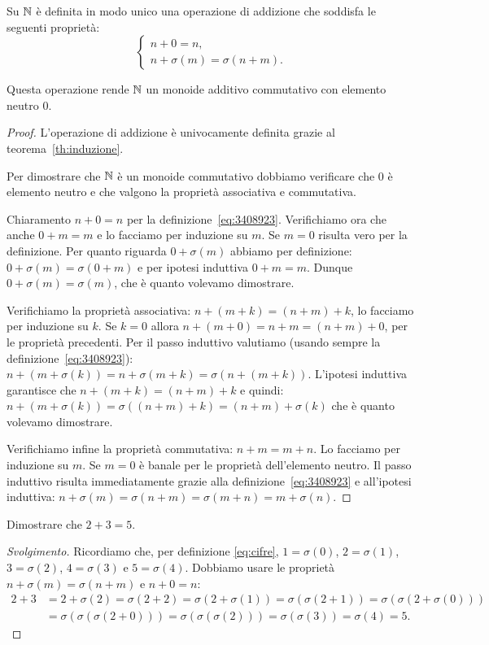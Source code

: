 \begin{theorem}[addizione su $\NN$]
  \label{th:addizione_naturali}%
Su $\NN$ è definita in modo unico una operazione di addizione 
che soddisfa le seguenti proprietà:
\begin{equation}\label{eq:3408923}
  \begin{cases}
    n + 0 = n,\\
    n + \sigma(m) = \sigma(n+m).
  \end{cases}
\end{equation}

Questa operazione rende $\NN$ un monoide additivo commutativo 
con elemento neutro $0$.
\end{theorem}
\begin{proof}
L'operazione di addizione è univocamente definita 
grazie al teorema~\ref{th:induzione}.

Per dimostrare che $\NN$ è un monoide commutativo dobbiamo verificare
che $0$ è elemento neutro e che valgono la proprietà associativa 
e commutativa.

Chiaramento $n+0=n$ per la definizione~\eqref{eq:3408923}. 
Verifichiamo ora che anche $0+m=m$ e lo facciamo per induzione su $m$.
Se $m=0$ risulta vero per la definizione.
Per quanto riguarda $0+\sigma(m)$ abbiamo per definizione:
$0+\sigma(m)=\sigma(0+m)$ e per ipotesi induttiva $0+m=m$.
Dunque $0+\sigma(m)=\sigma(m)$, che è quanto volevamo dimostrare.

Verifichiamo la proprietà associativa: $n+(m+k) = (n+m)+k$, lo 
facciamo per induzione su $k$. 
Se $k=0$ allora $n+(m+0)=n+m=(n+m)+0$, per le proprietà precedenti.
Per il passo induttivo valutiamo (usando sempre la definizione~\eqref{eq:3408923}):
$n+(m+\sigma(k)) = n+\sigma(m+k) =\sigma(n+(m+k))$.
L'ipotesi induttiva garantisce che $n+(m+k)=(n+m)+k$ e quindi:
$n+(m+\sigma(k)) = \sigma((n+m)+k) = (n+m)+\sigma(k)$
che è quanto volevamo dimostrare.

Verifichiamo infine la proprietà commutativa: $n+m=m+n$.
Lo facciamo per induzione su $m$. 
Se $m=0$ è banale per le proprietà dell'elemento neutro.
Il passo induttivo risulta immediatamente 
grazie alla definizione~\ref{eq:3408923} 
e all'ipotesi induttiva: 
$n+\sigma(m) = \sigma(n+m) = \sigma(m+n) = m+\sigma(n)$.
\end{proof}

\begin{example}\label{ex235}
  Dimostrare che $2+3=5$.
\end{example}  
%
\begin{proof}[Svolgimento]
Ricordiamo che, per definizione \eqref{eq:cifre}, 
$1=\sigma(0)$, $2=\sigma(1)$, $3=\sigma(2)$, $4=\sigma(3)$ e $5=\sigma(4)$.
Dobbiamo usare le proprietà $n+\sigma(m) = \sigma(n+m)$ 
e $n+0=n$:
\begin{align*}
2+3 &= 2 + \sigma(2) = \sigma(2+2) = \sigma(2+\sigma(1))
=\sigma(\sigma(2+1)) = \sigma(\sigma(2+\sigma(0)))\\
&=\sigma(\sigma(\sigma(2+0)))
=\sigma(\sigma(\sigma(2)))
=\sigma(\sigma(3))
=\sigma(4)=5.
\end{align*}
\end{proof}

